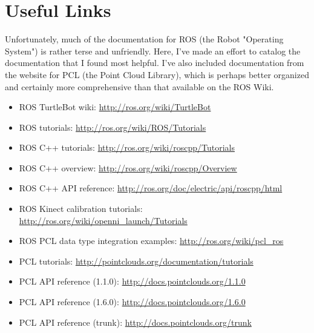 \documentclass[12pt]{report}
\begin{document}
\section{Useful Links}
Unfortunately, much of the documentation for ROS (the Robot "Operating System") is rather terse and unfriendly.  Here, I've made an effort to catalog the documentation that I found most helpful.  I've also included documentation from the website for PCL (the Point Cloud Library), which is perhaps better organized and certainly more comprehensive than that available on the ROS Wiki.
\begin{sloppypar}
\begin{itemize}
\item{ROS TurtleBot wiki: \url{http://ros.org/wiki/TurtleBot}}
\item{ROS tutorials: \url{http://ros.org/wiki/ROS/Tutorials}}
\item{ROS C++ tutorials: \url{http://ros.org/wiki/roscpp/Tutorials}}
\item{ROS C++ overview: \url{http://ros.org/wiki/roscpp/Overview}}
\item{ROS C++ API reference: \url{http://ros.org/doc/electric/api/roscpp/html}}
\item{ROS Kinect calibration tutorials: \url{http://ros.org/wiki/openni_launch/Tutorials}}
\item{ROS PCL data type integration examples: \url{http://ros.org/wiki/pcl_ros}}
\item{PCL tutorials: \url{http://pointclouds.org/documentation/tutorials}}
\item{PCL API reference (1.1.0): \url{http://docs.pointclouds.org/1.1.0}}
\item{PCL API reference (1.6.0): \url{http://docs.pointclouds.org/1.6.0}}
\item{PCL API reference (trunk): \url{http://docs.pointclouds.org/trunk}}
\end{itemize}
\end{sloppypar}
\end{document}
